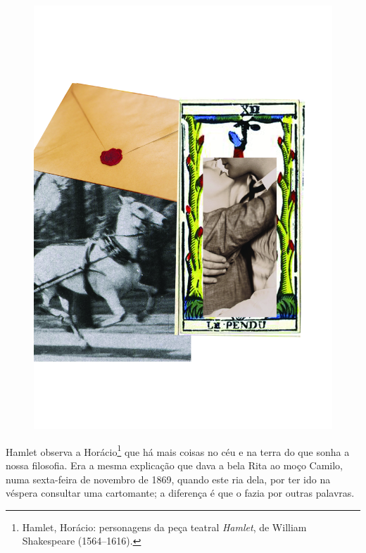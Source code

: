 \pagebreak
\thispagestyle{empty}
\begin{figure}
\includegraphics[width=\textwidth]{./ilustracoes/13_CARTOMANTE.jpg}
\end{figure}
\pagebreak


\noindent{}Hamlet observa a Horácio\footnote{Hamlet, Horácio: personagens da peça
  teatral \emph{Hamlet}, de William Shakespeare (1564--1616).} que há
mais coisas no céu e na terra do que sonha a nossa filosofia. Era a
mesma explicação que dava a bela Rita ao moço Camilo, numa sexta-feira
de novembro de 1869, quando este ria dela, por ter ido na véspera
consultar uma cartomante; a diferença é que o fazia por outras palavras.

